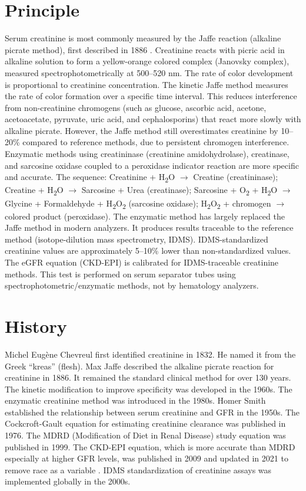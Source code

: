 \section*{Principle}
Serum creatinine is most commonly measured by the Jaffe reaction (alkaline picrate method), first described in 1886 \cite{tietz2023textbook}. Creatinine reacts with picric acid in alkaline solution to form a yellow-orange colored complex (Janovsky complex), measured spectrophotometrically at 500--520 nm. The rate of color development is proportional to creatinine concentration. The kinetic Jaffe method measures the rate of color formation over a specific time interval. This reduces interference from non-creatinine chromogens (such as glucose, ascorbic acid, acetone, acetoacetate, pyruvate, uric acid, and cephalosporins) that react more slowly with alkaline picrate. However, the Jaffe method still overestimates creatinine by 10--20\% compared to reference methods, due to persistent chromogen interference. Enzymatic methods using creatininase (creatinine amidohydrolase), creatinase, and sarcosine oxidase coupled to a peroxidase indicator reaction are more specific and accurate. The sequence: Creatinine + H\textsubscript{2}O $\rightarrow$ Creatine (creatininase); Creatine + H\textsubscript{2}O $\rightarrow$ Sarcosine + Urea (creatinase); Sarcosine + O\textsubscript{2} + H\textsubscript{2}O $\rightarrow$ Glycine + Formaldehyde + H\textsubscript{2}O\textsubscript{2} (sarcosine oxidase); H\textsubscript{2}O\textsubscript{2} + chromogen $\rightarrow$ colored product (peroxidase). The enzymatic method has largely replaced the Jaffe method in modern analyzers. It produces results traceable to the reference method (isotope-dilution mass spectrometry, IDMS). IDMS-standardized creatinine values are approximately 5--10\% lower than non-standardized values. The eGFR equation (CKD-EPI) is calibrated for IDMS-traceable creatinine methods. This test is performed on serum separator tubes using spectrophotometric/enzymatic methods, not by hematology analyzers.

\section*{History}
Michel Eugène Chevreul first identified creatinine in 1832. He named it from the Greek ``kreas'' (flesh). Max Jaffe described the alkaline picrate reaction for creatinine in 1886. It remained the standard clinical method for over 130 years. The kinetic modification to improve specificity was developed in the 1960s. The enzymatic creatinine method was introduced in the 1980s. Homer Smith established the relationship between serum creatinine and GFR in the 1950s. The Cockcroft-Gault equation for estimating creatinine clearance was published in 1976. The MDRD (Modification of Diet in Renal Disease) study equation was published in 1999. The CKD-EPI equation, which is more accurate than MDRD especially at higher GFR levels, was published in 2009 and updated in 2021 to remove race as a variable \cite{levey2009newequation}. IDMS standardization of creatinine assays was implemented globally in the 2000s.


